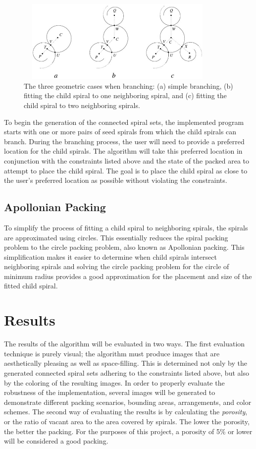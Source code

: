 \documentclass[11pt]{article}
\begin{document}
\begin{figure}[ht]
	\centering
	\includegraphics[width=100mm,height=40mm]{spiral-packing-fig-01}
	\caption{The three geometric cases when branching: (a) simple branching, (b) fitting the child spiral to one neighboring spiral, and (c) fitting the child spiral to two neighboring spirals. \cite{Browne2006834}}
	\label{fig:geo}
\end{figure}

	To begin the generation of the connected spiral sets, the implemented program starts with one or more pairs of seed spirals from which the child spirals can branch. During the branching process, the user will need to provide a preferred location for the child spirals. The algorithm will take this preferred location in conjunction with the constraints listed above and the state of the packed area to attempt to place the child spiral. The goal is to place the child spiral as close to the user's preferred location as possible without violating the constraints.

\subsection{Apollonian Packing}
	To simplify the process of fitting a child spiral to neighboring spirals, the spirals are approximated using circles. This essentially reduces the spiral packing problem to the circle packing problem, also known as Apollonian packing. This simplification makes it easier to determine when child spirals intersect neighboring spirals and solving the circle packing problem for the circle of minimum radius provides a good approximation for the placement and size of the fitted child spiral.

\section{Results}
	The results of the algorithm will be evaluated in two ways. The first evaluation technique is purely visual; the algorithm must produce images that are aesthetically pleasing as well as space-filling. This is determined not only by the generated connected spiral sets adhering to the constraints listed above, but also by the coloring of the resulting images. In order to properly evaluate the robustness of the implementation, several images will be generated to demonstrate different packing scenarios, bounding areas, arrangements, and color schemes. The second way of evaluating the results is by calculating the \textit{porosity}, or the ratio of vacant area to the area covered by spirals. The lower the porosity, the better the packing. For the purposes of this project, a porosity of 5\% or lower will be considered a good packing. 


{}	
\end{document}
